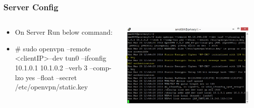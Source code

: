 \documentclass{beamer}
\begin{document}
\begin{frame}
\frametitle{Server Config}
\begin{columns}
    \begin{column}{0.48\textwidth}
	\begin{itemize}
	\item On Server Run below command:\\
	\item \# sudo openvpn --remote \textless clientIP\textgreater  --dev tun0 --ifconfig 10.1.0.1 10.1.0.2 --verb 3 --comp-lzo yes --float --secret /etc/openvpn/static.key
        \end{itemize}
    \end{column}
    \begin{column}{.5\textwidth}
        \includegraphics[width=.9\linewidth]{am1}
    \end{column}
\end{columns}
\end{frame}
\end{document}
